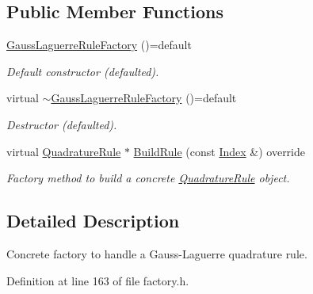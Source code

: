 \subsection*{Public Member Functions}
\begin{DoxyCompactItemize}
\item 
\hypertarget{classGaussLaguerreRuleFactory_aec92163584eea1e9fdc921afdfafba2e}{\hyperlink{classGaussLaguerreRuleFactory_aec92163584eea1e9fdc921afdfafba2e}{Gauss\-Laguerre\-Rule\-Factory} ()=default}\label{classGaussLaguerreRuleFactory_aec92163584eea1e9fdc921afdfafba2e}

\begin{DoxyCompactList}\small\item\em Default constructor (defaulted). \end{DoxyCompactList}\item 
\hypertarget{classGaussLaguerreRuleFactory_a8d39539bf7e6dd34cc298cf8c58060c8}{virtual \hyperlink{classGaussLaguerreRuleFactory_a8d39539bf7e6dd34cc298cf8c58060c8}{$\sim$\-Gauss\-Laguerre\-Rule\-Factory} ()=default}\label{classGaussLaguerreRuleFactory_a8d39539bf7e6dd34cc298cf8c58060c8}

\begin{DoxyCompactList}\small\item\em Destructor (defaulted). \end{DoxyCompactList}\item 
virtual \hyperlink{classQuadratureRule}{Quadrature\-Rule} $\ast$ \hyperlink{classGaussLaguerreRuleFactory_a1e907a5209041516fa18c86c79fb1ec6}{Build\-Rule} (const \hyperlink{typedefs_8h_a2c726f8f32697958e9d6c2afecda531d}{Index} \&) override
\begin{DoxyCompactList}\small\item\em Factory method to build a concrete \hyperlink{classQuadratureRule}{Quadrature\-Rule} object. \end{DoxyCompactList}\end{DoxyCompactItemize}


\subsection{Detailed Description}
Concrete factory to handle a Gauss-\/\-Laguerre quadrature rule. 

Definition at line 163 of file factory.\-h.



